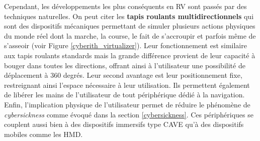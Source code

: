 Cependant, les développements les plus conséquents en RV sont passés par des techniques naturelles. 
On peut citer les \textbf{tapis roulants multidirectionnels} qui sont des dispositifs mécaniques permettant de simuler plusieurs actions physiques du monde réel dont la marche, la course, le fait de s'accroupir et parfois même de s'asseoir (voir Figure \ref{cyberith_virtualizer}). Leur fonctionnement est similaire aux tapis roulants standards mais la grande différence provient de leur capacité à bouger dans toutes les directions, offrant ainsi à l'utilisateur une possibilité de déplacement à 360 degrés. Leur second avantage est leur positionnement fixe, restreignant ainsi l'espace nécessaire à leur utilisation. Ils permettent également de libérer les mains de l'utilisateur de tout périphérique dédié à la navigation. Enfin, l'implication physique de l'utilisateur permet de réduire le phénomène de \textit{cybersickness} comme évoqué dans la section \ref{cybersickness}.
Ces périphériques se couplent aussi bien à des dispositifs immersifs type CAVE qu'à des dispositifs mobiles comme les HMD.

